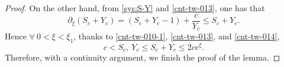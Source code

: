 \documentclass[12pt]{article}
\theoremstyle{definition}
\theoremstyle{remark}
\numberwithin{equation}{section}
\begin{document}
\begin{proof}
On the other hand, from \eqref{sys:S-Y} and \eqref{cnt-tw-013}, one has that
\begin{equation}
    \label{cnt-tw-014}
    \partial_\xi (S_c + Y_c ) = (S_c + Y_c - 1) + \frac{c}{Y_c} \leq S_c + Y_c. 
\end{equation}
Hence $ \forall \ 0 < \xi < \xi_1 $, thanks to \eqref{cnt-tw-010-1}, \eqref{cnt-tw-013}, and \eqref{cnt-tw-014},
\begin{equation}
    \label{cnt-tw-015}
    c < S_c,\ Y_c \leq S_c + Y_c \leq 2 c e^\xi.
\end{equation}
Therefore, with a continuity argument, we finish the proof of the lemma. 
\end{proof}







\end{document}
